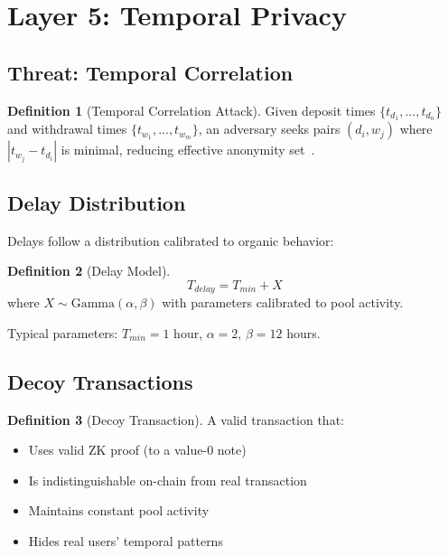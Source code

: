 \documentclass[11pt]{article}
\theoremstyle{definition}
\newtheorem{definition}{Definition}[section]
\theoremstyle{plain}
\theoremstyle{remark}
\begin{document}
\section{Layer 5: Temporal Privacy}
\label{sec:layer5}

\subsection{Threat: Temporal Correlation}

\begin{definition}[Temporal Correlation Attack]
Given deposit times $\{t_{d_1}, ..., t_{d_n}\}$ and withdrawal times $\{t_{w_1}, ..., t_{w_m}\}$, an adversary seeks pairs $(d_i, w_j)$ where $|t_{w_j} - t_{d_i}|$ is minimal, reducing effective anonymity set~\cite{moser2013anonymity}.
\end{definition}

\subsection{Delay Distribution}

Delays follow a distribution calibrated to organic behavior:

\begin{definition}[Delay Model]
\begin{equation}
T_{delay} = T_{min} + X
\end{equation}
where $X \sim \text{Gamma}(\alpha, \beta)$ with parameters calibrated to pool activity.

Typical parameters: $T_{min} = 1$ hour, $\alpha = 2$, $\beta = 12$ hours.
\end{definition}

\subsection{Decoy Transactions}

\begin{definition}[Decoy Transaction]
A valid transaction that:
\begin{itemize}
    \item Uses valid ZK proof (to a value-0 note)
    \item Is indistinguishable on-chain from real transaction
    \item Maintains constant pool activity
    \item Hides real users' temporal patterns
\end{itemize}
\end{definition}
\end{document}

